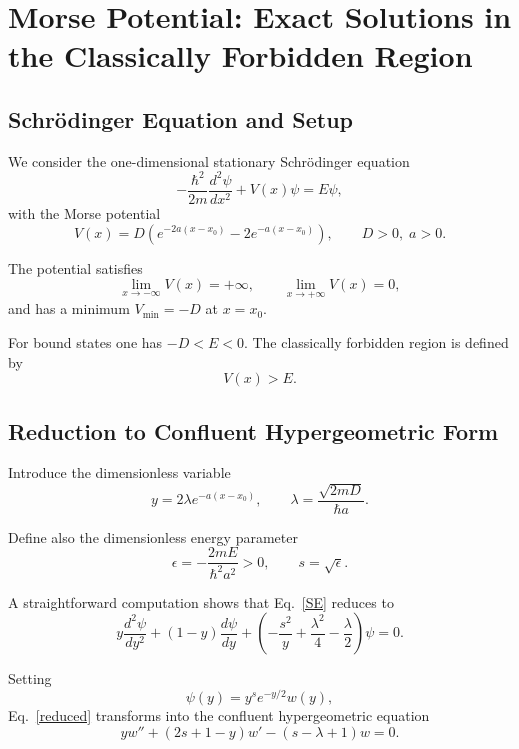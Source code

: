 \section{Morse Potential: Exact Solutions in the Classically Forbidden Region}

\subsection{Schrödinger Equation and Setup}

We consider the one-dimensional stationary Schrödinger equation
\begin{equation}
- \frac{\hbar^2}{2m}\frac{d^2\psi}{dx^2}
+ V(x)\psi
= E\psi,
\label{SE}
\end{equation}
with the Morse potential
\begin{equation}
V(x)=D\left(e^{-2a(x-x_0)}-2e^{-a(x-x_0)}\right),
\qquad
D>0,\; a>0 .
\label{Morse}
\end{equation}

The potential satisfies
\[
\lim_{x\to -\infty}V(x)=+\infty,
\qquad
\lim_{x\to +\infty}V(x)=0,
\]
and has a minimum $V_{\min}=-D$ at $x=x_0$.

For bound states one has $-D<E<0$.  
The classically forbidden region is defined by
\[
V(x)>E .
\]

\subsection{Reduction to Confluent Hypergeometric Form}

Introduce the dimensionless variable
\begin{equation}
y = 2\lambda e^{-a(x-x_0)},
\qquad
\lambda=\frac{\sqrt{2mD}}{\hbar a}.
\label{ydef}
\end{equation}

Define also the dimensionless energy parameter
\begin{equation}
\epsilon = -\frac{2mE}{\hbar^2 a^2} >0,
\qquad
s=\sqrt{\epsilon}.
\label{edef}
\end{equation}

A straightforward computation shows that Eq.~\eqref{SE} reduces to
\begin{equation}
y\frac{d^2\psi}{dy^2}
+(1-y)\frac{d\psi}{dy}
+\left(
-\frac{s^2}{y}
+\frac{\lambda^2}{4}
-\frac{\lambda}{2}
\right)\psi
=0 .
\label{reduced}
\end{equation}

Setting
\[
\psi(y)=y^{s}e^{-y/2}w(y),
\]
Eq.~\eqref{reduced} transforms into the confluent hypergeometric equation
\begin{equation}
y w'' + (2s+1-y) w' - (s-\lambda+1) w =0.
\end{equation}


